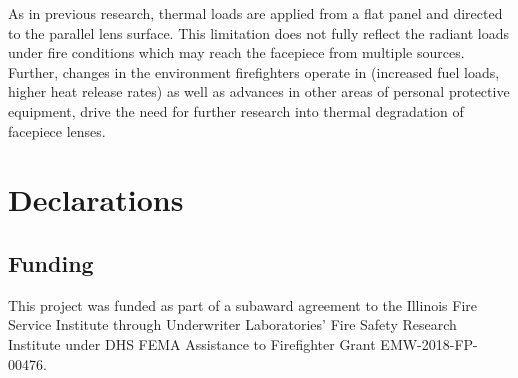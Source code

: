 \documentclass[sn-mathphys]{sn-jnl}%
\theoremstyle{thmstyleone}%
\theoremstyle{thmstyletwo}%
\theoremstyle{thmstylethree}%
\begin{document}
As in previous research, thermal loads are applied from a flat panel and directed to the parallel lens surface. This limitation does not fully reflect the radiant loads under fire conditions which may reach the facepiece from multiple sources. Further, changes in the environment firefighters operate in (increased fuel loads, higher heat release rates) as well as advances in other areas of personal protective equipment, drive the need for further research into thermal degradation of facepiece lenses. 


\section*{Declarations}
\subsection*{Funding}

This project was funded as part of a subaward agreement to the Illinois Fire Service Institute through Underwriter Laboratories’ Fire Safety Research Institute under DHS FEMA Assistance to Firefighter Grant EMW-2018-FP-00476. 





\end{document}
